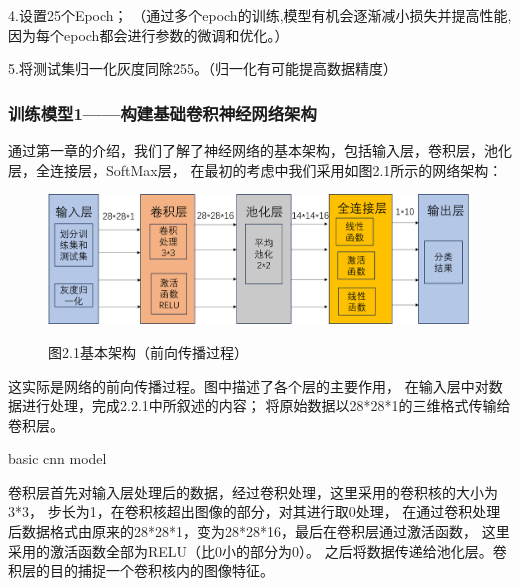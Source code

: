 \documentclass[10.5pt,compsoc,UTF8]{CjC}
\theoremstyle{mystyle}
\begin{document}
4.设置25个Epoch；
（通过多个epoch的训练,模型有机会逐渐减小损失并提高性能,因为每个epoch都会进行参数的微调和优化。）

5.将测试集归一化灰度同除255。（归一化有可能提高数据精度）


\subsubsection{训练模型1——构建基础卷积神经网络架构}

通过第一章的介绍，我们了解了神经网络的基本架构，包括输入层，卷积层，池化层，全连接层，SoftMax层，
在最初的考虑中我们采用如图2.1所示的网络架构：


\begin{figure}[htbp]
\centering
\centerline{\includegraphics[width=1\linewidth]{CNN21.png}}
\heiti 图2.1\quad  基本架构（前向传播过程）
\label{fig1}
\end{figure}

这实际是网络的前向传播过程。图中描述了各个层的主要作用，
在输入层中对数据进行处理，完成2.2.1中所叙述的内容；
将原始数据以28*28*1的三维格式传输给卷积层。

\begin{algorithm}
\caption{basic cnn model}
\end{algorithm}




卷积层首先对输入层处理后的数据，经过卷积处理，这里采用的卷积核的大小为3*3，
步长为1，在卷积核超出图像的部分，对其进行取0处理，
在通过卷积处理后数据格式由原来的28*28*1，变为28*28*16，最后在卷积层通过激活函数，
这里采用的激活函数全部为RELU（比0小的部分为0）。
之后将数据传递给池化层。卷积层的目的捕捉一个卷积核内的图像特征。
\end{document}
